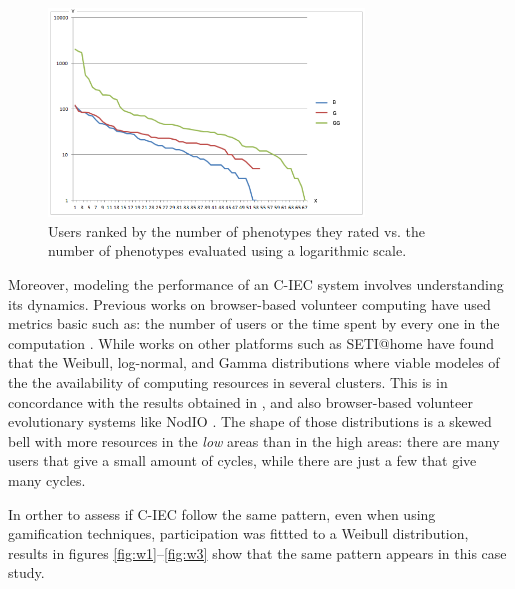 \begin{figure}[!t]
    \centering
        \includegraphics[width=3.3in]{img/comparison.png}
    \caption{Users ranked by the number of phenotypes they rated vs. the number of phenotypes evaluated using a logarithmic scale. }
    \label{fig:top-ranked-participation}
\end{figure}

Moreover, modeling the performance of an C-IEC system
involves understanding its dynamics. Previous works on browser-based
volunteer computing have used metrics basic such as: 
the number of users or the time spent by every one in the
computation \cite{DBLP:journals/gpem/LaredoBGVAGF14, 2016arXiv160101607M}. 
While works on other platforms such as SETI@home
\cite{javadi2009mining} have found that the Weibull, log-normal, and
Gamma distributions where viable modeles of the  
the availability of computing resources in several clusters.
This is in concordance with the results obtained in \cite{agajaj}, and also
browser-based volunteer evolutionary systems like NodIO \cite{DBLP:conf/gecco/MereloCGCRV16}.
The shape of those distributions is a skewed bell
with more resources in the {\em low} areas than in the high areas:
there are many users that give a small amount of cycles, while there
are just a few that give many cycles. 

In orther to assess if C-IEC follow the same pattern, even when
using gamification techniques, participation was fittted to a 
Weibull distribution, results in figures \ref{fig:w1}--\ref{fig:w3}  show that 
the same pattern appears in this case study. 


